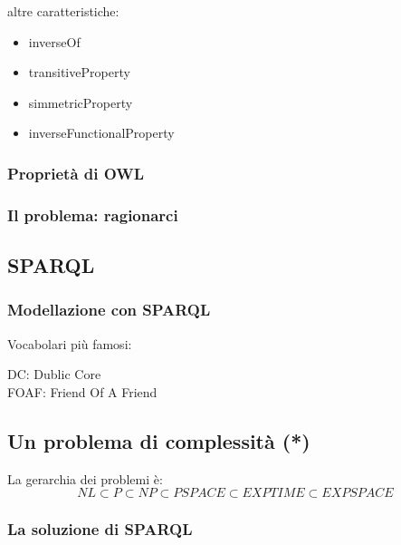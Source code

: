 				altre caratteristiche:
				
					\begin{itemize}
						\item inverseOf
						\item transitiveProperty
						\item simmetricProperty
						\item inverseFunctionalProperty
					\end{itemize}
					
			\subsubsection{Proprietà di OWL}
				
			\subsubsection{Il problema: ragionarci}
			
			
		\subsection{SPARQL}
		
			\subsubsection{Modellazione con SPARQL}		
				
				Vocabolari più famosi:
				\begin{description}
					\item[DC: Dublic Core]
					\item[FOAF: Friend Of A Friend]
				\end{description}		
		
		\subsection{Un problema di complessità (*)}
		
			La gerarchia dei problemi è:
			\[
				NL \subset P \subset NP \subset PSPACE \subset EXPTIME \subset EXPSPACE
			\]
			
			\subsubsection{La soluzione di SPARQL}
			
